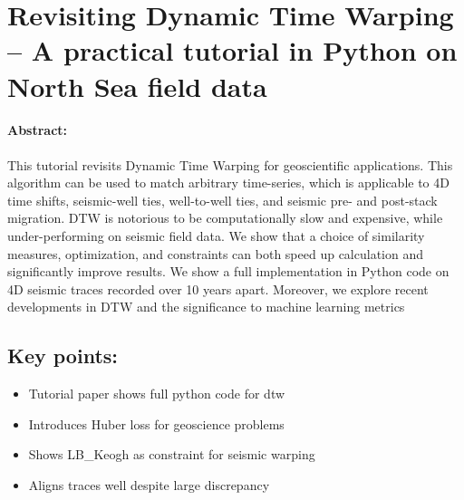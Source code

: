\section[Dynamic Time Warping Tutorial Paper]{Revisiting Dynamic Time Warping -- A practical tutorial in Python on North Sea field data}

\paragraph{Abstract:} This tutorial revisits Dynamic Time Warping for geoscientific applications.  This algorithm can be used to match arbitrary time-series, which is applicable to 4D time shifts, seismic-well ties, well-to-well ties, and seismic pre- and post-stack migration.  DTW is notorious to be computationally slow and expensive, while under-performing on seismic field data.  We show that a choice of similarity measures, optimization, and constraints can both speed up calculation and significantly improve results.  We show a full implementation in Python code on 4D seismic traces recorded over 10 years apart. Moreover, we explore recent developments in DTW and the significance to machine learning metrics
\vfill
\subsection*{Key points:}
\begin{itemize}
    \item Tutorial paper shows full python code for \acl{dtw}
    \item Introduces Huber loss for geoscience problems
    \item Shows LB\_Keogh as constraint for seismic warping
    \item Aligns traces well despite large discrepancy
\end{itemize}
\vfill

{\vfill\hfill\newline{}}

